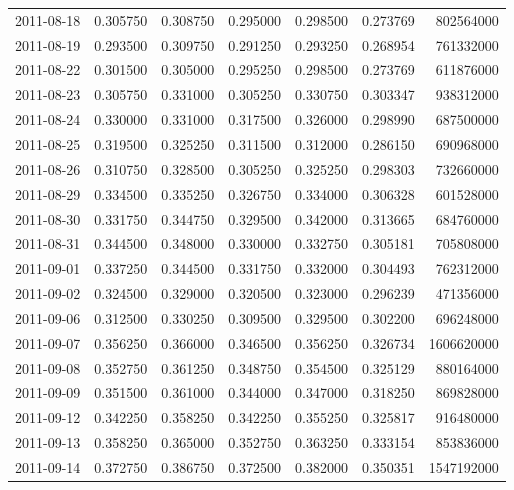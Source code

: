\begin{tabular}{lrrrrrr}
2011-08-18 &    0.305750 &    0.308750 &    0.295000 &    0.298500 &    0.273769 &   802564000 \\
2011-08-19 &    0.293500 &    0.309750 &    0.291250 &    0.293250 &    0.268954 &   761332000 \\
2011-08-22 &    0.301500 &    0.305000 &    0.295250 &    0.298500 &    0.273769 &   611876000 \\
2011-08-23 &    0.305750 &    0.331000 &    0.305250 &    0.330750 &    0.303347 &   938312000 \\
2011-08-24 &    0.330000 &    0.331000 &    0.317500 &    0.326000 &    0.298990 &   687500000 \\
2011-08-25 &    0.319500 &    0.325250 &    0.311500 &    0.312000 &    0.286150 &   690968000 \\
2011-08-26 &    0.310750 &    0.328500 &    0.305250 &    0.325250 &    0.298303 &   732660000 \\
2011-08-29 &    0.334500 &    0.335250 &    0.326750 &    0.334000 &    0.306328 &   601528000 \\
2011-08-30 &    0.331750 &    0.344750 &    0.329500 &    0.342000 &    0.313665 &   684760000 \\
2011-08-31 &    0.344500 &    0.348000 &    0.330000 &    0.332750 &    0.305181 &   705808000 \\
2011-09-01 &    0.337250 &    0.344500 &    0.331750 &    0.332000 &    0.304493 &   762312000 \\
2011-09-02 &    0.324500 &    0.329000 &    0.320500 &    0.323000 &    0.296239 &   471356000 \\
2011-09-06 &    0.312500 &    0.330250 &    0.309500 &    0.329500 &    0.302200 &   696248000 \\
2011-09-07 &    0.356250 &    0.366000 &    0.346500 &    0.356250 &    0.326734 &  1606620000 \\
2011-09-08 &    0.352750 &    0.361250 &    0.348750 &    0.354500 &    0.325129 &   880164000 \\
2011-09-09 &    0.351500 &    0.361000 &    0.344000 &    0.347000 &    0.318250 &   869828000 \\
2011-09-12 &    0.342250 &    0.358250 &    0.342250 &    0.355250 &    0.325817 &   916480000 \\
2011-09-13 &    0.358250 &    0.365000 &    0.352750 &    0.363250 &    0.333154 &   853836000 \\
2011-09-14 &    0.372750 &    0.386750 &    0.372500 &    0.382000 &    0.350351 &  1547192000 \\

\end{tabular}
